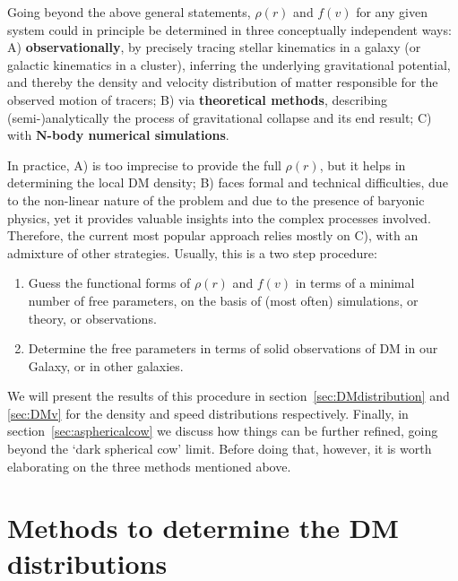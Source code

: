 Going beyond the above general statements, 
 $\rho(r)$ and $f(v)$ for any given system could in principle be determined in three conceptually independent ways: 
{A)} {\bf observationally}, by precisely tracing stellar kinematics in a galaxy (or galactic kinematics in a cluster), inferring the underlying gravitational potential, and thereby the density and velocity distribution of matter responsible for the observed motion of tracers; 
{B)} via {\bf theoretical methods}, describing (semi-)analytically the process of gravitational collapse and its end result; 
{C)} with {\bf ${\bm N}$-body numerical simulations}. 

In practice, A) is too imprecise to provide the full $\rho(r)$,
but it helps in determining the local DM density;
B) faces formal and technical difficulties, due to the non-linear nature of the problem and due to the presence of baryonic physics, yet it provides valuable insights into the complex processes involved.
Therefore, the current most popular approach relies mostly on C), with an admixture of other strategies. Usually, this is a two step procedure:
 \begin{enumerate}
\item Guess the functional forms of $\rho(r)$ and $f(v)$ in terms of a minimal number of free parameters, on the basis of (most often) simulations, or theory, or observations.
\item Determine the free parameters in terms of solid observations of DM in our Galaxy, or in other galaxies.
\end{enumerate}
We will present the results of this procedure in section~\ref{sec:DMdistribution} and \ref{sec:DMv} for the density and speed distributions respectively. 
Finally, in section~\ref{sec:asphericalcow} we discuss how things can be further refined, going beyond the `dark spherical cow' limit.
Before doing that, however, it is worth elaborating on the three methods mentioned above. 

 
\section{Methods to determine the DM distributions} 
 
